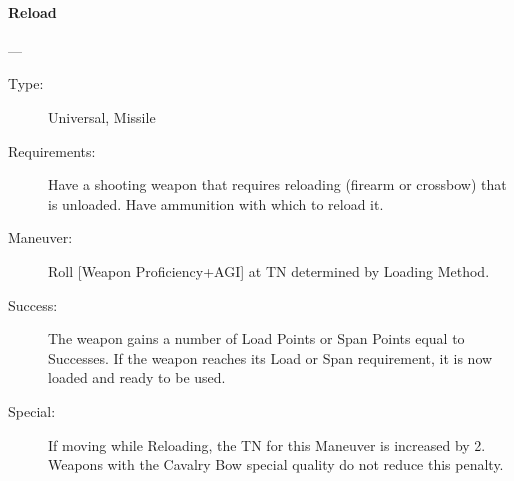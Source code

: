 \documentclass[oneside,11pt,english]{book}
\begin{document}
\paragraph{\large\label{man:Reload}Reload}---\quad{\large[???????]}
\vspace{-10pt}\begin{description} 
\item [Type:] Universal, Missile 
\item [Requirements:] Have a shooting weapon that requires reloading (firearm or crossbow) that is unloaded. 
Have ammunition with which to reload it. 
\item [Maneuver:] Roll [Weapon Proficiency+AGI] at TN determined by Loading Method. 
\item [Success:] The weapon gains a number of Load Points or Span Points equal to Successes. If the weapon 
reaches its Load or Span requirement, it is now loaded and ready to be used. 
\item [Special:] If moving while Reloading, the TN for this Maneuver is increased by 2. Weapons with the 
Cavalry Bow special quality do not reduce this penalty. 
\end{description}
\end{document}
